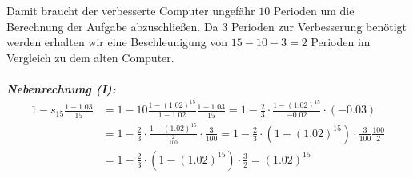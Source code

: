Damit braucht der verbesserte Computer ungefähr $ 10 $ Perioden um die Berechnung der Aufgabe abzuschließen. Da $ 3 $ Perioden zur Verbesserung benötigt werden erhalten wir eine Beschleunigung von $ 15 -10 -3  = 2 $ Perioden im Vergleich zu dem alten Computer.\\
\\
\textbf{\textit{Nebenrechnung (I):}}
\begin{align*}
	1 -  s_{15} \frac{1- 1.03}{15}
	&=
	1 - 10 \frac{1 - (1.02)^{15}}{1 - 1.02} \frac{1- 1.03}{15}
	=
	1 - \frac{2}{3}  \cdot \frac{1 - (1.02)^{15}}{-0.02} \cdot  (- 0.03)\\
	&=
	1 - \frac{2}{3} \cdot \frac{1 - (1.02)^{15}}{\frac{2}{100}} \cdot  \frac{3}{100}
	=
	1 - \frac{2}{3} \cdot (1 - (1.02)^{15} )\cdot  \frac{3}{100}  \frac{100}{2}\\
	&=
	1 - \frac{2}{3} \cdot (1 - (1.02)^{15} )\cdot  \frac{3}{2} 
	=
	(1.02)^{15} 
\end{align*}

\newpage
